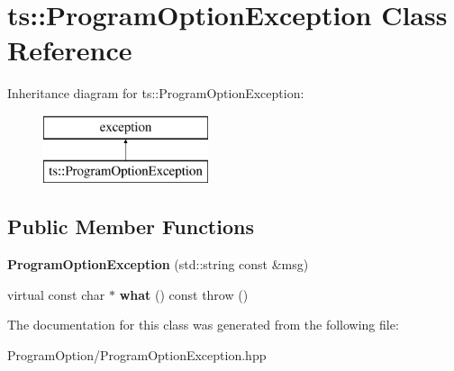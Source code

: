 \hypertarget{classts_1_1_program_option_exception}{}\section{ts\+:\+:Program\+Option\+Exception Class Reference}
\label{classts_1_1_program_option_exception}
Inheritance diagram for ts\+:\+:Program\+Option\+Exception\+:\begin{figure}[H]
\begin{center}
\leavevmode
\includegraphics[height=2.000000cm]{classts_1_1_program_option_exception}
\end{center}
\end{figure}
\subsection*{Public Member Functions}
\begin{DoxyCompactItemize}
\item 
\mbox{\label{classts_1_1_program_option_exception_ac6907eecf1de5d6f3987a6d88b623e51}} 
{\bfseries Program\+Option\+Exception} (std\+::string const \&msg)
\item 
\mbox{\label{classts_1_1_program_option_exception_a88bd1d294f107dfb5c8696cd7f7c3e4c}} 
virtual const char $\ast$ {\bfseries what} () const  throw ()
\end{DoxyCompactItemize}


The documentation for this class was generated from the following file\+:\begin{DoxyCompactItemize}
\item 
Program\+Option/Program\+Option\+Exception.\+hpp\end{DoxyCompactItemize}
